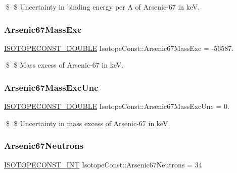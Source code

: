 \$ \$ Uncertainty in binding energy per A of Arsenic-\/67 in keV. \mbox{\label{group___isotope_const-_arsenic-_as67_gafcc8e29127e3d0ddb684fe415dfa182d}} 
\subsubsection{\texorpdfstring{Arsenic67\+Mass\+Exc}{Arsenic67MassExc}}
{\footnotesize\ttfamily \mbox{\hyperlink{group___isotope_const-_macros_ga8f45a7272ce02c0b4c65c44636ed719a}{I\+S\+O\+T\+O\+P\+E\+C\+O\+N\+S\+T\+\_\+\+D\+O\+U\+B\+LE}} Isotope\+Const\+::\+Arsenic67\+Mass\+Exc = -\/56587.}

\$ \$ Mass excess of Arsenic-\/67 in keV. \mbox{\label{group___isotope_const-_arsenic-_as67_ga4121901adeade5459f1bff65196f6a4f}} 
\subsubsection{\texorpdfstring{Arsenic67\+Mass\+Exc\+Unc}{Arsenic67MassExcUnc}}
{\footnotesize\ttfamily \mbox{\hyperlink{group___isotope_const-_macros_ga8f45a7272ce02c0b4c65c44636ed719a}{I\+S\+O\+T\+O\+P\+E\+C\+O\+N\+S\+T\+\_\+\+D\+O\+U\+B\+LE}} Isotope\+Const\+::\+Arsenic67\+Mass\+Exc\+Unc = 0.}

\$ \$ Uncertainty in mass excess of Arsenic-\/67 in keV. \mbox{\label{group___isotope_const-_arsenic-_as67_gadef966777ced58274c9d26b258e6a94a}} 
\subsubsection{\texorpdfstring{Arsenic67\+Neutrons}{Arsenic67Neutrons}}
{\footnotesize\ttfamily \mbox{\hyperlink{group___isotope_const-_macros_ga5f18360b3e99483a35c32d789e62621c}{I\+S\+O\+T\+O\+P\+E\+C\+O\+N\+S\+T\+\_\+\+I\+NT}} Isotope\+Const\+::\+Arsenic67\+Neutrons = 34}

